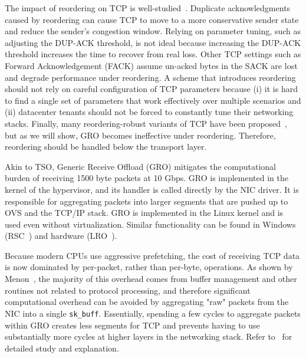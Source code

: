  The impact of reordering on TCP is well-studied~\cite{leung2007overview,paxson1997end}. 
Duplicate acknowledgments caused by reordering
can cause TCP to move to a more conservative sender state and reduce the sender's congestion window.
Relying on parameter tuning, such as adjusting the DUP-ACK threshold, is not ideal because 
increasing the DUP-ACK threshold increases the time to recover from real loss. Other TCP settings
such as Forward Acknowledgement (FACK) assume un-acked bytes in the SACK are lost and degrade
performance under reordering. 
A scheme that introduces reordering should not rely on careful configuration of TCP parameters
because (i) it is hard to find a single set of parameters that work effectively over multiple 
scenarios and (ii) datacenter tenants should not be forced to constantly tune their networking stacks.
Finally, many reordering-robust variants of TCP have been proposed~\cite{rr-tcp,blanton2002making,tcp-pr}, but
as we will show, GRO becomes ineffective under reordering. Therefore, reordering should
be handled below the transport layer.

Akin to TSO, Generic Receive Offload (GRO) mitigates the computational burden of receiving
1500 byte packets at 10 Gbps. GRO is implemented in the kernel of the hypervisor,
and its handler is called directly by the NIC driver. It is responsible
for aggregating packets into larger segments that are pushed up to OVS and the TCP/IP stack. 
GRO is implemented in the Linux kernel and is used even without virtualization. Similar
functionality can be found in Windows (RSC~\cite{ms-rsc}) and hardware (LRO~\cite{grossman2005large}).

Because modern CPUs use aggressive prefetching, the cost of receiving
TCP data is now dominated by per-packet, rather than per-byte, operations.
As shown by Menon~\cite{optimize-tcp-receive},  the majority of this overhead comes from
buffer management and other routines not related to protocol processing, and therefore 
significant computational overhead can be avoided by aggregating "raw" packets from
the NIC into a single {\tt sk\_buff}.
Essentially, spending a few cycles to aggregate packets within GRO creates less segments for
TCP and prevents having to use substantially more cycles at higher layers in the networking stack.
Refer to~\cite{linuxgro,optimize-tcp-receive} for detailed study and explanation.


